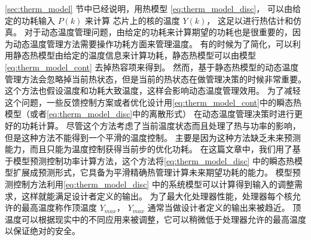  \ref{sec:therm_model} 节中已经说明，用热模型 \eqref{eq:therm_model_disc}， 可以由给定的功耗输入 $P(k)$ 来计算
芯片上的核的温度 $Y(k)$， 这足以进行热估计和仿真。
对于动态温度管理问题，由给定的功耗来计算期望的功耗也是很重要的，因为动态温度管理方法需要操作功耗方面来管理温度。
有的时候为了简化，可以利用静态热模型由给定的温度信息来计算功耗，静态热模型可以由模型 \eqref{eq:therm_model_cont} 去掉热容项来得到。
然而，基于静态热模型的动态温度管理方法会忽略掉当前热状态，但是当前的热状态在做管理决策的时候非常重要。
这个方法也假设温度和功耗大致温度，这样会影响动态温度管理效用。
为了减轻这个问题，一些反馈控制方案或者优化设计用\eqref{eq:therm_model_cont}中的瞬态热模型（或者\eqref{eq:therm_model_disc}中的离散形式）
在动态温度管理决策时进行更好的功耗计算。
尽管这个方法考虑了当前温度状态而且处理了热与功率的影响，但是这种方法不能得到一个平滑的温度控制。
主要是因为这种方法缺乏未来预测能力，而且只能为温度控制获得当前步的优化功耗。
在这篇文章中，我们用了基于模型预测控制功率计算方法，这个方法将\eqref{eq:therm_model_disc} 中的瞬态热模型扩展成预测形式，它具备为平滑精确热管理计算未来期望功耗的能力。
模型预测控制方法利用\eqref{eq:therm_model_disc} 中的系统模型可以计算得到输入的调整需求，这样就能满足设计者定义的输出。
为了最大化处理器性能，处理器每个核允许的最高温度称作顶温度 $Y_{max}$， $Y_{max}$ 通常当做设计者定义的输出来被趋近。
顶温度可以根据现实中的不同应用来被调整，它可以稍微低于处理器允许的最高温度以保证绝对的安全。

